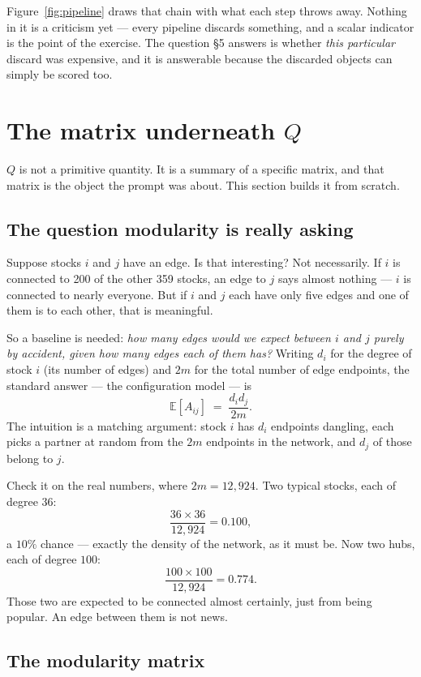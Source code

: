 \documentclass[11pt,a4paper]{article}
\newcommand{\Q}{Q}
\begin{document}
Figure~\ref{fig:pipeline} draws that chain with what each step throws away.
Nothing in it is a criticism yet --- every pipeline discards something, and a
scalar indicator is the point of the exercise. The question \S5 answers is
whether \emph{this particular} discard was expensive, and it is answerable
because the discarded objects can simply be scored too.

\section{The matrix underneath \texorpdfstring{$\Q$}{Q}}
\label{sec:matrix}

$\Q$ is not a primitive quantity. It is a summary of a specific matrix, and that
matrix is the object the prompt was about. This section builds it from
scratch.

\subsection{The question modularity is really asking}

Suppose stocks $i$ and $j$ have an edge. Is that interesting? Not necessarily.
If $i$ is connected to 200 of the other 359 stocks, an edge to $j$ says
almost nothing --- $i$ is connected to nearly everyone. But if $i$ and $j$ each
have only five edges and one of them is to each other, that is meaningful.

So a baseline is needed: \emph{how many edges would we expect between $i$ and
$j$ purely by accident, given how many edges each of them has?} Writing $d_i$
for the degree of stock $i$ (its number of edges) and $2m$ for the total number
of edge endpoints, the standard answer --- the configuration model --- is
\[
  \mathbb{E}\left[A_{ij}\right] \;=\; \frac{d_i d_j}{2m}.
\]
The intuition is a matching argument: stock $i$ has $d_i$ endpoints dangling,
each picks a partner at random from the $2m$ endpoints in the network, and $d_j$
of those belong to $j$.

Check it on the real numbers, where $2m=12{,}924$. Two typical stocks, each of
degree $36$:
\[
  \frac{36\times36}{12{,}924}=0.100,
\]
a $10\%$ chance --- exactly the density of the network, as it must be. Now two
hubs, each of degree $100$:
\[
  \frac{100\times100}{12{,}924}=0.774.
\]
Those two are expected to be connected almost certainly, just from being
popular. An edge between them is not news.

\subsection{The modularity matrix}
\end{document}
